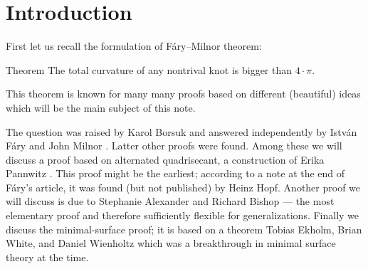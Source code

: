 \section{Introduction}

First let us recall the formulation of F\'ary--Milnor theorem:

\begin{thm}{Theorem}\label{thm:fary-milnor}
The total curvature of any nontrival knot is bigger than $4\cdot\pi$. 
\end{thm}


This theorem is known for many many proofs based on different (beautiful) ideas which will be the main subject of this note.

The question was raised by Karol Borsuk \cite{borsuk} and answered independently by Istv\'an F\'ary and John Milnor \cite{fary, milnor}.
Latter other proofs were found.
Among these we will discuss a proof based on alternated quadrisecant, a construction of Erika Pannwitz \cite{pannwitz}.
This proof might be the earliest; according to a note at the end of Fáry’s article, it was found (but not published) by Heinz Hopf.
Another proof we will discuss is due to Stephanie Alexander and Richard Bishop --- the most elementary proof and therefore sufficiently flexible for generalizations.
Finally we discuss the minimal-surface proof;
it is based on a theorem Tobias Ekholm, Brian White, and Daniel Wienholtz \cite{EWW_embed} which was a breakthrough in minimal surface theory at the time.
